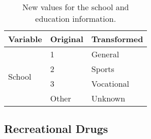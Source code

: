 \begin{table}[H]
	\centering

    \label{table:Table_School_Info_Transform_Categories}
    
	\renewcommand{\arraystretch}{1.5}

    \begin{tabular}{l | l | l}
		\hline
        \rowcolor[HTML]{FF9999}		
		
        \textbf{Variable} & \textbf{Original} & \textbf{Transformed} \\ 		
        
        \hline 
                                 
            \multirow{4}{*}{School} & \multicolumn{1}{l}{1}     & \multicolumn{1}{l}{General}    \\\cline{2-3}
                                    & \multicolumn{1}{l}{2}     & \multicolumn{1}{l}{Sports}     \\\cline{2-3}
                                    & \multicolumn{1}{l}{3}     & \multicolumn{1}{l}{Vocational} \\\cline{2-3}
                                    & \multicolumn{1}{l}{Other} & \multicolumn{1}{l}{Unknown}    \\\hline


        \end{tabular}

    \caption{New values for the school and education information.}

\end{table}



\subsection{Recreational Drugs}

